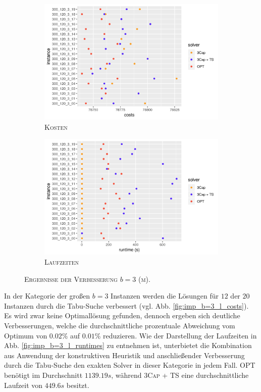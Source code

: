 \begin{figure}[H]
\centering
\begin{subfigure}[b]{0.49\textwidth}
\includegraphics[width=\textwidth]{img/imp_b=3_m_costs.png}
\caption{\textsc{Kosten}}
\label{fig:imp_b=3_m_costs}
\end{subfigure}
\hfill
\begin{subfigure}[b]{0.49\textwidth}
\includegraphics[width=\textwidth]{img/imp_b=3_m_runtimes.png}
\caption{\textsc{Laufzeiten}}
\label{fig:imp_b=3_m_runtimes}
\end{subfigure}
\caption{\textsc{Ergebnisse der Verbesserung $b = 3$ (m)}.}
\label{fig:imp_res_b=3_m}
\end{figure}

In der Kategorie der großen $b = 3$ Instanzen werden die Lösungen für $12$ der $20$ Instanzen durch
die Tabu-Suche verbessert (vgl. Abb. \ref{fig:imp_b=3_l_costs}).
Es wird zwar keine Optimallösung gefunden, dennoch ergeben sich deutliche Verbesserungen, welche
die durchschnittliche prozentuale Abweichung vom Optimum von $0.02 \%$ auf $0.01 \%$ reduzieren.
Wie der Darstellung der Laufzeiten in Abb. \ref{fig:imp_b=3_l_runtimes} zu entnehmen ist, unterbietet die
Kombination aus Anwendung der konstruktiven Heuristik und anschließender Verbesserung durch die Tabu-Suche
den exakten Solver in dieser Kategorie in jedem Fall. \textsc{OPT} benötigt im Durchschnitt $1139.19s$,
während \textsc{3Cap + TS} eine durchschnittliche Laufzeit von $449.6s$ besitzt.

